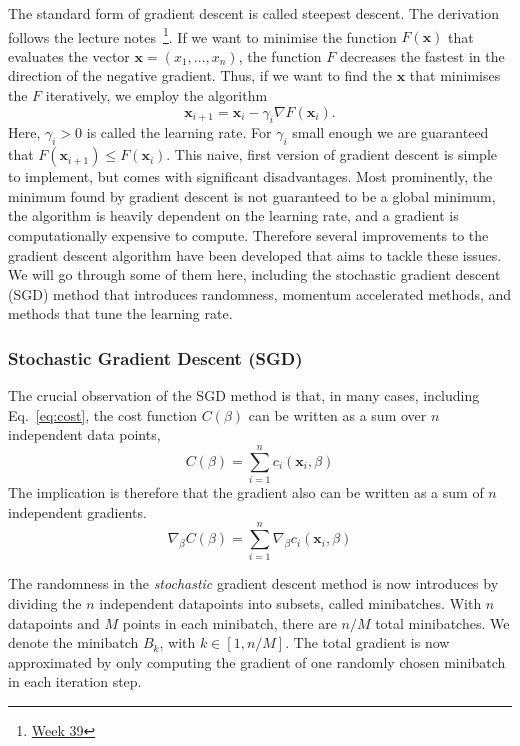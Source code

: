 \documentclass[a4paper, 
amsfonts, 
amssymb, 
amsmath, 
reprint, 
showkeys, 
nofootinbib, 
twoside]{revtex4-2}
\begin{document}
The standard form of gradient descent is called steepest descent. The derivation follows the lecture notes~\footnote{\href{https://compphysics.github.io/MachineLearning/doc/pub/week39/html/week39.html}{Week 39}}. If we want to minimise the function $F(\bm{x})$ that evaluates the vector $\bm{x} = (x_1, ... , x_n)$, the function $F$ decreases the fastest in the direction of the negative gradient. Thus, if we want to find the $\bm{x}$ that minimises the $F$ iteratively, we employ the algorithm
\begin{equation}
    \bm{x}_{i+1} = \bm{x}_i - \gamma_{i}\nabla F(\bm{x}_i).
\end{equation}
Here, $\gamma_i > 0$ is called the learning rate. For $\gamma_i$ small enough we are guaranteed that $F(\bm{x}_{i+1}) \leq F(\bm{x}_{i})$. This naive, first version of gradient descent is simple to implement, but comes with significant disadvantages. Most prominently, the minimum found by gradient descent is not guaranteed to be a global minimum, the algorithm is heavily dependent on the learning rate, and a gradient is computationally expensive to compute. Therefore several improvements to the gradient descent algorithm have been developed that aims to tackle these issues. We will go through some of them here, including the stochastic gradient descent (SGD) method that introduces randomness, momentum accelerated methods, and methods that tune the learning rate.

\subsubsection{Stochastic Gradient Descent (SGD)}

The crucial observation of the SGD method is that, in many cases, including Eq.~\eqref{eq:cost}, the cost function $C(\beta)$ can be written as a sum over $n$ independent data points,
\begin{equation}
    C(\beta) = \sum_{i = 1}^n c_i(\bm{x}_i, \beta)
\end{equation}
The implication is therefore that the gradient also can be written as a sum of $n$ independent gradients.
\begin{equation}
    \nabla_{\beta} C(\beta) =  \sum_{i = 1}^n \nabla_{\beta}c_i(\bm{x}_i, \beta)
\end{equation}

The randomness in the \textit{stochastic} gradient descent method is now introduces by dividing the $n$ independent datapoints into subsets, called minibatches. With $n$ datapoints and $M$ points in each minibatch, there are $n/M$ total minibatches. We denote the minibatch $B_k$, with $k \in [1, n/M]$. The total gradient is now approximated by only computing the gradient of one randomly chosen minibatch in each iteration step. 
\end{document}
